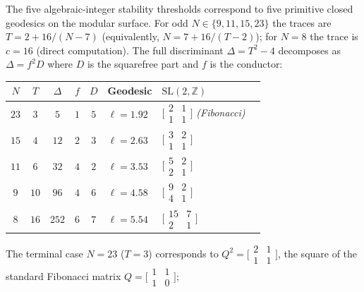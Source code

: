 \begin{proposition}
\label{prop:geodesic-correspondence}
The five algebraic-integer stability thresholds correspond to
five primitive closed geodesics on the modular surface.
For odd $N \in \{9, 11, 15, 23\}$ the traces are
$T = 2 + 16/(N{-}7)$
(equivalently, $N = 7 + 16/(T{-}2)$);
for $N = 8$ the trace is $c = 16$ (direct computation).
The full discriminant $\Delta = T^2 - 4$ decomposes as
$\Delta = f^2 D$ where $D$ is the squarefree part and $f$ is
the conductor:
\begin{center}
\begin{tabular}{ccccclll}
\toprule
$N$ & $T$ & $\Delta$ & $f$ & $D$ &
  Geodesic & $\mathrm{SL}(2,\mathbb{Z})$ \\
\midrule
$23$ & $3$  & $5$   & $1$ & $5$ &
  $\ell = 1.92$ & $\bigl[\begin{smallmatrix}2&1\\1&1\end{smallmatrix}\bigr]$
  \emph{(Fibonacci)} \\
$15$ & $4$  & $12$  & $2$ & $3$ &
  $\ell = 2.63$ & $\bigl[\begin{smallmatrix}3&2\\1&1\end{smallmatrix}\bigr]$ \\
$11$ & $6$  & $32$  & $4$ & $2$ &
  $\ell = 3.53$ & $\bigl[\begin{smallmatrix}5&2\\2&1\end{smallmatrix}\bigr]$ \\
$9$  & $10$ & $96$  & $4$ & $6$ &
  $\ell = 4.58$ & $\bigl[\begin{smallmatrix}9&2\\4&1\end{smallmatrix}\bigr]$ \\
$8$  & $16$ & $252$ & $6$ & $7$ &
  $\ell = 5.54$ & $\bigl[\begin{smallmatrix}15&7\\2&1\end{smallmatrix}\bigr]$ \\
\bottomrule
\end{tabular}
\end{center}
The terminal case $N = 23$ ($T = 3$) corresponds to
$Q^2 = \bigl[\begin{smallmatrix}2&1\\1&1\end{smallmatrix}\bigr]$,
the square of the standard Fibonacci matrix
$Q = \bigl[\begin{smallmatrix}1&1\\1&0\end{smallmatrix}\bigr]$;

\end{proposition}
